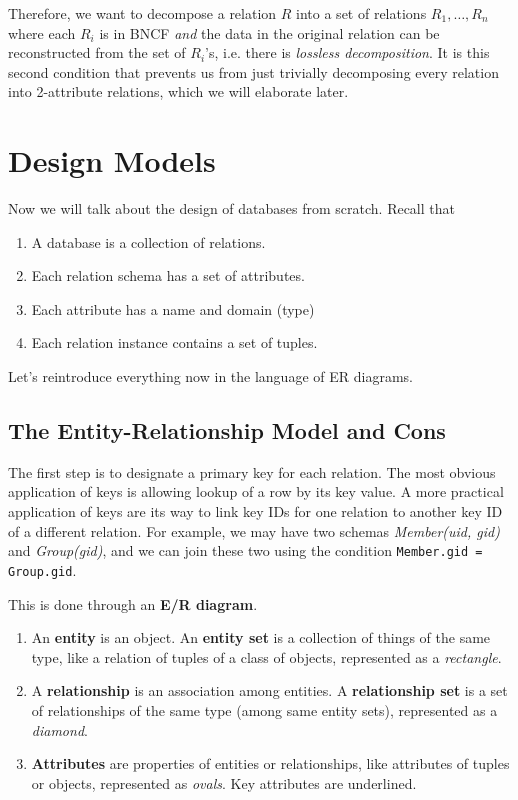 \documentclass{article}
\begin{document}
    Therefore, we want to decompose a relation $R$ into a set of relations $R_1, \ldots, R_n$ where each $R_i$ is in BNCF \textit{and} the data in the original relation can be reconstructed from the set of $R_i$'s, i.e. there is \textit{lossless decomposition}. It is this second condition that prevents us from just trivially decomposing every relation into 2-attribute relations, which we will elaborate later. 

\section{Design Models}

    Now we will talk about the design of databases from scratch. Recall that 
    \begin{enumerate}
      \item A database is a collection of relations. 
      \item Each relation schema has a set of attributes. 
      \item Each attribute has a name and domain (type) 
      \item Each relation instance contains a set of tuples. 
    \end{enumerate}

    Let's reintroduce everything now in the language of ER diagrams. 

  \subsection{The Entity-Relationship Model and Cons} 

    The first step is to designate a primary key for each relation. The most obvious application of keys is allowing lookup of a row by its key value. A more practical application of keys are its way to link key IDs for one relation to another key ID of a different relation. For example, we may have two schemas \textit{Member(uid, gid)} and \textit{Group(gid)}, and we can join these two using the condition \texttt{Member.gid = Group.gid}. 

    \begin{definition}
      This is done through an \textbf{E/R diagram}. 
      \begin{enumerate}
        \item An \textbf{entity} is an object. An \textbf{entity set} is a collection of things of the same type, like a relation of tuples of a class of objects, represented as a \textit{rectangle}. 
        \item A \textbf{relationship} is an association among entities. A \textbf{relationship set} is a set of relationships of the same type (among same entity sets), represented as a \textit{diamond}. 
        \item \textbf{Attributes} are properties of entities or relationships, like attributes of tuples or objects, represented as \textit{ovals}. Key attributes are underlined. 
      \end{enumerate}
    \end{definition}
\end{document}
